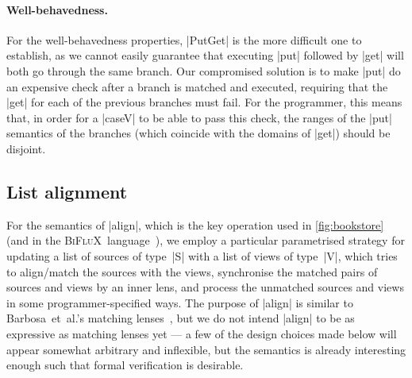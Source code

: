 \documentclass{sigplanconf}
\newcommand{\BiFluX}{\textsc{BiFluX}}
\begin{document}
\paragraph{Well-behavedness.}
For the well-behavedness properties, |PutGet| is the more difficult one to establish, as we cannot easily guarantee that executing |put| followed by |get| will both go through the same branch.
Our compromised solution is to make |put| do an expensive check after a branch is matched and executed, requiring that the |get| for each of the previous branches must fail.
For the programmer, this means that, in order for a |caseV| to be able to pass this check, the ranges of the |put| semantics of the branches (which coincide with the domains of |get|) should be disjoint.

\subsection{List alignment}
\label{sec:list-alignment}

For the semantics of |align|, which is the key operation used in \autoref{fig:bookstore} (and in the \BiFluX\ language~\cite{Pacheco-BiFluX}), we employ a particular parametrised strategy for updating a list of sources of type~|S| with a list of views of type~|V|, which tries to align/match the sources with the views, synchronise the matched pairs of sources and views by an inner lens, and process the unmatched sources and views in some programmer-specified ways.
The purpose of |align| is similar to Barbosa~et~al.'s matching lenses~\cite{Barbosa:2010}, but we do not intend |align| to be as expressive as matching lenses yet --- a few of the design choices made below will appear somewhat arbitrary and inflexible, but the semantics is already interesting enough such that formal verification is desirable.
\end{document}
